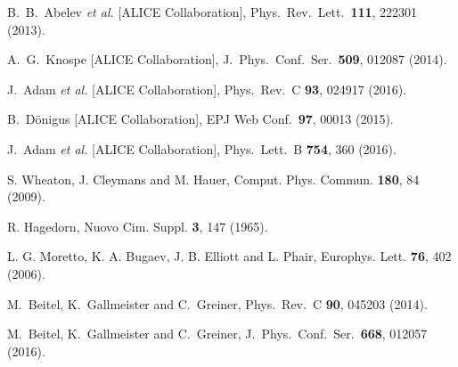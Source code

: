 \documentclass[12pt]{article}
\begin{document}
\begin{thebibliography}{99}
  B.~B.~Abelev {\it et al.} [ALICE Collaboration],
  Phys.\ Rev.\ Lett.\  {\bf 111}, 222301 (2013).

  A.~G.~Knospe [ALICE Collaboration],
  J.\ Phys.\ Conf.\ Ser.\  {\bf 509}, 012087 (2014).

  J.~Adam {\it et al.} [ALICE Collaboration],
  Phys.\ Rev.\ C {\bf 93}, 024917 (2016).

  B.~D\"onigus [ALICE Collaboration],
  EPJ Web Conf.\  {\bf 97}, 00013 (2015).

  J.~Adam {\it et al.} [ALICE Collaboration],
  Phys.\ Lett.\ B {\bf 754}, 360 (2016).

%
S. Wheaton, J. Cleymans and M. Hauer, Comput. Phys. Commun. {\bf 180}, 84 (2009).

%
R. Hagedorn, Nuovo Cim. Suppl.  {\bf 3}, 147 (1965).

%
L. G. Moretto,  K. A. Bugaev, J. B. Elliott and L. Phair,
 Europhys. Lett.  {\bf 76},  402 (2006).
%


%
  M.~Beitel, K.~Gallmeister and C.~Greiner,
  Phys.\ Rev.\ C {\bf 90}, 045203 (2014).

%
M.~Beitel, K.~Gallmeister and C.~Greiner,
  J.\ Phys.\ Conf.\ Ser.\  {\bf 668},  012057 (2016).


\end{thebibliography}
\end{document}
